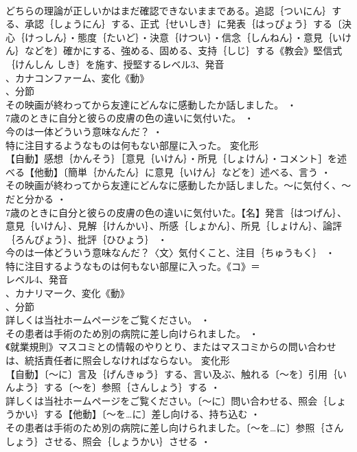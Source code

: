 \documentclass[8pt]{extreport}
\begin{document}
\begin{CJK}{UTF8}{min}
\\	どちらの理論が正しいかはまだ確認できないままである。追認｛ついにん｝する、承認｛しょうにん｝する、正式｛せいしき｝に発表｛はっぴょう｝する〔決心｛けっしん｝・態度｛たいど｝・決意｛けつい｝・信念｛しんねん｝・意見｛いけん｝などを〕確かにする、強める、固める、支持｛しじ｝する《教会》堅信式｛けんしん しき｝を施す、授堅するレベル3、発音
\\	、カナコンファーム、変化《動》
\\	、分節
\\	その映画が終わってから友達にどんなに感動したか話しました。 ・
\\	7歳のときに自分と彼らの皮膚の色の違いに気付いた。 ・
\\	今のは一体どういう意味なんだ？ ・
\\	特に注目するようなものは何もない部屋に入った。	変化形 
\\	【自動】感想｛かんそう｝［意見｛いけん｝・所見｛しょけん｝・コメント］を述べる【他動】〔簡単｛かんたん｝に意見｛いけん｝などを〕述べる、言う ・
\\	その映画が終わってから友達にどんなに感動したか話しました。～に気付く、～だと分かる ・
\\	7歳のときに自分と彼らの皮膚の色の違いに気付いた。【名】発言｛はつげん｝、意見｛いけん｝、見解｛けんかい｝、所感｛しょかん｝、所見｛しょけん｝、論評｛ろんぴょう｝、批評｛ひひょう｝ ・
\\	今のは一体どういう意味なんだ？〈文〉気付くこと、注目｛ちゅうもく｝ ・
\\	特に注目するようなものは何もない部屋に入った。《コ》＝
\\	レベル4、発音
\\	、カナリマーク、変化《動》
\\	、分節
\\	詳しくは当社ホームページをご覧ください。 ・
\\	その患者は手術のため別の病院に差し向けられました。 ・
\\	《就業規則》マスコミとの情報のやりとり、またはマスコミからの問い合わせは、統括責任者に照会しなければならない。	変化形 
\\	【自動】〔～に〕言及｛げんきゅう｝する、言い及ぶ、触れる〔～を〕引用｛いんよう｝する〔～を〕参照｛さんしょう｝する ・
\\	詳しくは当社ホームページをご覧ください。〔～に〕問い合わせる、照会｛しょうかい｝する【他動】〔～を…に〕差し向ける、持ち込む ・
\\	その患者は手術のため別の病院に差し向けられました。〔～を…に〕参照｛さんしょう｝させる、照会｛しょうかい｝させる ・

\end{CJK}
\end{document}
